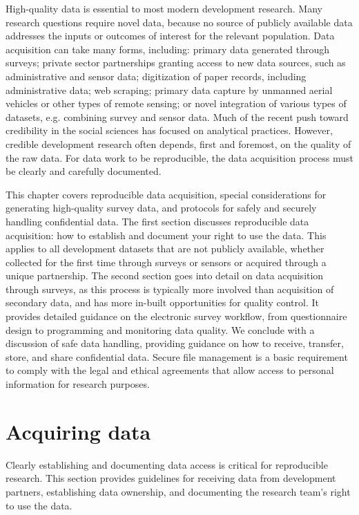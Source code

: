 
\begin{fullwidth}
High-quality data is essential to most modern development research.
Many research questions require novel data, 
because no source of publicly available data addresses the 
inputs or outcomes of interest for the relevant population.
Data acquisition can take many forms, including: 
primary data generated through surveys; 
private sector partnerships granting access to new data sources, such as administrative and sensor data;
digitization of paper records, including administrative data; web scraping;
primary data capture by unmanned aerial vehicles or other types of remote sensing;
or novel integration of various types of datasets, e.g. combining survey and sensor data.
Much of the recent push toward credibility in the social sciences has focused on analytical practices.
However, credible development research often depends, first and foremost, on the quality of the raw data.
For data work to be reproducible, the data acquisition process must be clearly and carefully documented.

This chapter covers reproducible data acquisition,
special considerations for generating high-quality survey data, 
and protocols for safely and securely handling confidential data. 
The first section discusses reproducible data acquisition:
how to establish and document your right to use the data.
This applies to all development datasets that are not publicly available, 
whether collected for the first time through surveys or sensors or acquired through a unique partnership.
The second section goes into detail on data acquisition through surveys, 
as this process is typically more involved than acquisition of secondary data, 
and has more in-built opportunities for quality control.
It provides detailed guidance on the electronic survey workflow,
from questionnaire design to programming and monitoring data quality.
We conclude with a discussion of safe data handling, 
providing guidance on how to receive, transfer, store, and share confidential data.
Secure file management is a basic requirement to comply with the legal and 
ethical agreements that allow  access to personal information for research purposes.


\end{fullwidth}

\section{Acquiring data}
Clearly establishing and documenting data access is critical for reproducible research.  
This section provides guidelines for receiving data from development partners,
establishing data ownership, 
and documenting the research team's right to use the data. 

